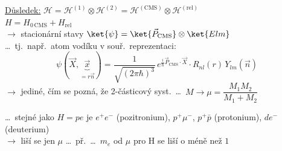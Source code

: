 \begin{priklad}
\underline{Důsledek:} \quad $\mathcal{H} = \mathcal{H}^{(1)}\otimes\mathcal{H}^{(2)} = \mathcal{H}^{(\text{CMS})}\otimes\mathcal{H}^{(\text{rel})}$ \\
\hspace*{2cm} $H = H_{0\,\text{CMS}} + H_{\text{rel}}$ \hfill {} \\
$\to$ stacionární stavy \quad $\ket{\psi} = \ket{\vec P_{\text{CMS}}}\otimes\ket{Elm}$ \\
\quad \dots\ tj.\ např.\ atom vodíku v souř.\ reprezentaci:
\[
  \psi(\vec X,\underbrace{\vec x}_{=r\vec n}) = \frac{1}{\sqrt{(2\pi\hbar)^3}}\,e^{\frac{i}{\hbar}\vec P_{\text{CMS}}\cdot\vec X}\cdot R_{nl}(r)\,Y_{lm}(\vec n)
\]
$\to$ jediné, čím se pozná, že 2-částicový syst.\ \dots\ $M\to\mu = \dfrac{M_1M_2}{M_1 + M_2}$

\dots\ stejné jako $H = pe$ je $e^+e^-$ (pozitronium), $p^+\mu^-$, $p^+\bar p$ (protonium), $de^-$ (deuterium) \\
\hspace*{2cm} $\to$ liší se jen $\mu$ \quad \dots\ př.\ \dots\ $m_e$ od $\mu$ pro H se liší o méně než $1\,$\textperthousand
\end{priklad}

